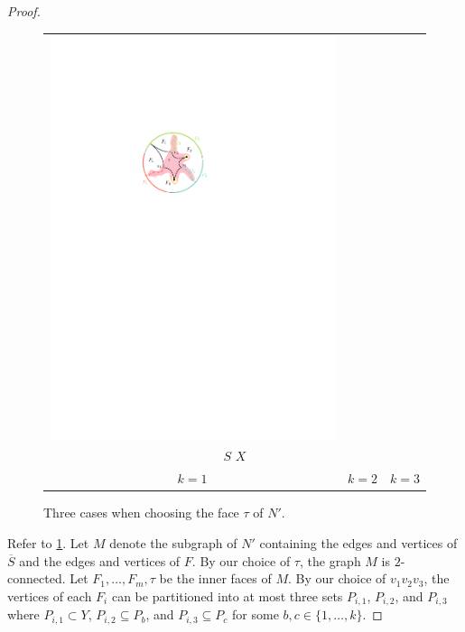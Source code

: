 \documentclass{patmorin}
\theoremstyle{plain}
\theoremstyle{definition}
\begin{document}
\begin{proof}
\begin{figure}
\begin{center}
\begin{tabular}{c@{}c@{}c}
				\includegraphics{figs/zoomba-3} \\
        \multicolumn{3}{c}{{\color{brew8}\raisebox{-3pt}{\rule{12pt}{12pt}}} $S$\qquad {\color{brew2}\raisebox{-3pt}{\rule{12pt}{12pt}}} $X$} \\
				$k=1$ & $k=2$ & $k=3$
			\end{tabular}
		\end{center}
		\caption{Three cases when choosing the face $\tau$ of $N'$.}
		\label{boring_figure}
	\end{figure}

	Refer to \cref{boring_figure}.  Let $M$ denote the subgraph of $N'$ containing the edges and vertices of $\overline{S}$ and the edges and vertices of $F$. By our choice of $\tau$, the graph $M$ is $2$-connected.
	Let $F_1,\ldots,F_m,\tau$ be the inner faces of $M$. By our choice of $v_1v_2v_3$, the vertices of each $F_i$ can be partitioned into at most three sets $P_{i,1}$, $P_{i,2}$, and $P_{i,3}$ where $P_{i,1}\subset Y$, $P_{i,2}\subseteq P_b$, and $P_{i,3}\subseteq P_c$ for some $b,c\in\{1,\ldots,k\}$.


\end{proof}
\end{document}
